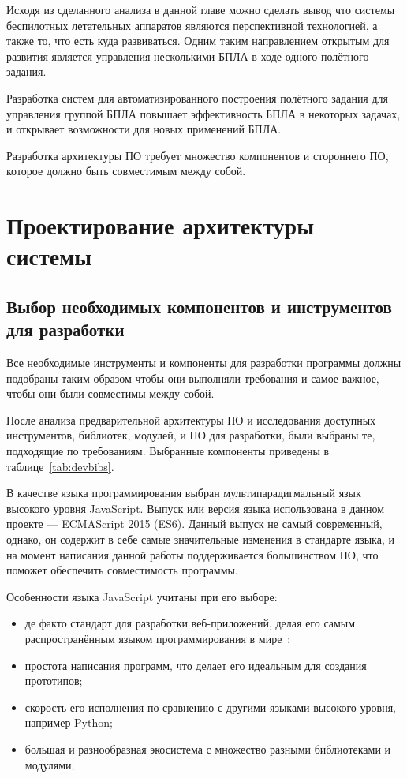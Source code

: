 \documentclass[specification,annotation]{itmo-student-thesis}
\begin{document}
Исходя из сделанного анализа в данной главе можно сделать вывод что системы
беспилотных летательных аппаратов являются перспективной технологией, а также
то, что есть куда развиваться. Одним таким направлением открытым для развития
является управления несколькими БПЛА в ходе одного полётного задания.

Разработка систем для автоматизированного построения полётного задания для
управления группой БПЛА повышает эффективность БПЛА в некоторых задачах, и
открывает возможности для новых применений БПЛА.

Разработка архитектуры ПО требует множество компонентов и стороннего ПО,
которое должно быть совместимым между собой.

\chapter{Проектирование архитектуры системы}\label{ch:designarch}

\section{Выбор необходимых компонентов и инструментов для
разработки}\label{sec:choosecomps}

Все необходимые инструменты и компоненты для разработки программы должны
подобраны таким образом чтобы они выполняли требования и самое важное, чтобы они
были совместимы между собой.

После анализа предварительной архитектуры ПО и исследования доступных
инструментов, библиотек, модулей, и ПО для разработки, были выбраны те,
подходящие по требованиям. Выбранные компоненты приведены в
таблице~\ref{tab:devbibs}.

В качестве языка программирования выбран мультипарадигмальный язык высокого
уровня JavaScript. Выпуск или версия языка использована в данном проекте ---
ECMAScript 2015 (ES6). Данный выпуск не самый современный, однако, он содержит в
себе самые значительные изменения в стандарте языка, и на момент написания
данной работы поддерживается большинством ПО, что поможет обеспечить
совместимость программы.

Особенности языка JavaScript учитаны при его выборе:

\begin{itemize}
  \item де факто стандарт для разработки веб-приложений, делая его самым
    распространённым языком программирования в мире~\cite{stackoverflow-survey};
  \item простота написания программ, что делает его идеальным для создания
    прототипов;
  \item скорость его исполнения по сравнению с другими языками высокого уровня,
    например Python;
  \item большая и разнообразная экосистема с множество разными библиотеками и
    модулями;
\end{itemize}
\end{document}
